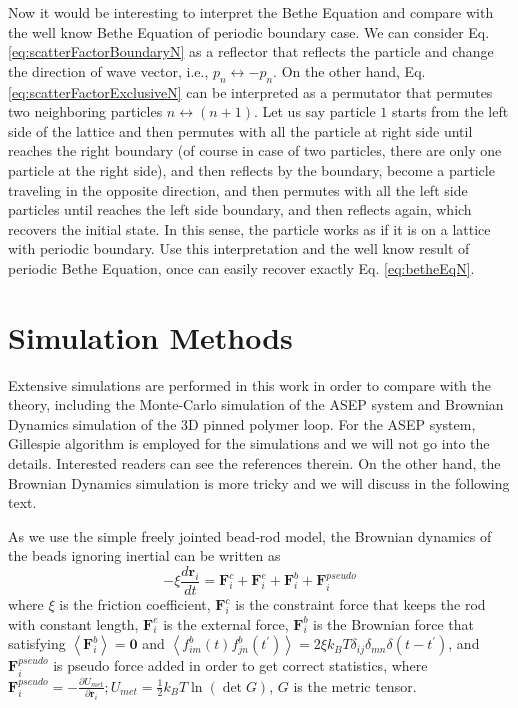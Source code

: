 \documentclass[aps,showpacs,twocolumn,floatfix,prx,superscriptaddress]{revtex4-1}
\begin{document}
Now it would be interesting to interpret the Bethe Equation and compare with the well know Bethe Equation of periodic boundary case. We can consider Eq.  \eqref{eq:scatterFactorBoundaryN} as a reflector that reflects the particle and change the direction of wave vector, i.e., $p_n\leftrightarrow-p_n$.  On the other hand, Eq. \eqref{eq:scatterFactorExclusiveN} can be interpreted as a permutator that permutes two neighboring particles $n\leftrightarrow (n+1)$.  Let us say particle $1$ starts from the left side of the lattice and then permutes with all the particle at right side until reaches the right boundary (of course in case of two particles, there are only one particle at the right side), and then reflects by the boundary, become a particle traveling in the opposite direction, and then permutes with all the left side particles until reaches the left side boundary, and then reflects again, which recovers the initial state.  In this sense, the particle works as if it is on a lattice with periodic boundary. Use this interpretation and the well know result of periodic Bethe Equation, once can easily recover exactly Eq. \eqref{eq:betheEqN}. 


\section{Simulation Methods}
\label{sec:simulation_methods}

Extensive simulations are performed in this work in order to compare with the theory, including the Monte-Carlo simulation of the ASEP system and Brownian Dynamics simulation of the 3D pinned polymer loop. For the ASEP system, Gillespie algorithm \cite{} is employed for the simulations and we will not go into the details. Interested readers can see the references therein. On the other hand, the Brownian Dynamics simulation is more tricky and we will discuss in the following text.

As we use the simple freely jointed bead-rod model, the Brownian dynamics of the beads ignoring inertial can be written as
\begin{equation}
    \label{eq:beadDynamics}
    -\xi \frac{d \mathbf{r}_i}{d t} = \mathbf{F}_i^{c} + \mathbf{F}_i^{e} + \mathbf{F}_i^{b} + \mathbf{F}_i^{pseudo}
\end{equation}
where $\xi$ is the friction coefficient, $\mathbf{F}_i^{c}$ is the constraint force that keeps the rod with constant length, $\mathbf{F}_i^e$ is the external force, $\mathbf{F}_i^{b}$ is the Brownian force that satisfying $\left<\mathbf{F}_i^{b}\right> = \mathbf{0}$ and $\left<f_{im}^b(t)f_{jn}^b(t^\prime)\right> = 2\xi k_B T \delta_{ij} \delta_{m n}\delta(t-t^\prime)$, and $\mathbf{F}_i^{pseudo}$ is pseudo force added in order to get correct statistics, where $\mathbf{F}_i^{pseudo} = -\frac{\partial U_{met}}{\partial\mathbf{r}_i}; U_{met} = \frac{1}{2}k_B T \ln(\det G)$, $G$ is the metric tensor\cite{}.
\end{document}
